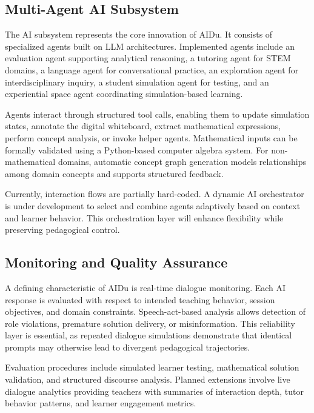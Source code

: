 \documentclass[10pt,twocolumn]{article}
\begin{document}
\subsection{Multi-Agent AI Subsystem}\label{multi-agent-ai-subsystem}

The AI subsystem represents the core innovation of AIDu. It consists of
specialized agents built on LLM architectures. Implemented agents
include an evaluation agent supporting analytical reasoning, a tutoring
agent for STEM domains, a language agent for conversational practice, an
exploration agent for interdisciplinary inquiry, a student simulation
agent for testing, and an experiential space agent coordinating
simulation-based learning.

Agents interact through structured tool calls, enabling them to update
simulation states, annotate the digital whiteboard, extract mathematical
expressions, perform concept analysis, or invoke helper agents.
Mathematical inputs can be formally validated using a Python-based
computer algebra system. For non-mathematical domains, automatic concept
graph generation models relationships among domain concepts and supports
structured feedback.

Currently, interaction flows are partially hard-coded. A dynamic AI
orchestrator is under development to select and combine agents
adaptively based on context and learner behavior. This orchestration
layer will enhance flexibility while preserving pedagogical control.

\subsection{Monitoring and Quality
Assurance}\label{monitoring-and-quality-assurance}

A defining characteristic of AIDu is real-time dialogue monitoring. Each
AI response is evaluated with respect to intended teaching behavior,
session objectives, and domain constraints. Speech-act-based analysis
allows detection of role violations, premature solution delivery, or
misinformation. This reliability layer is essential, as repeated
dialogue simulations demonstrate that identical prompts may otherwise
lead to divergent pedagogical trajectories.

Evaluation procedures include simulated learner testing, mathematical
solution validation, and structured discourse analysis. Planned
extensions involve live dialogue analytics providing teachers with
summaries of interaction depth, tutor behavior patterns, and learner
engagement metrics.
\end{document}
